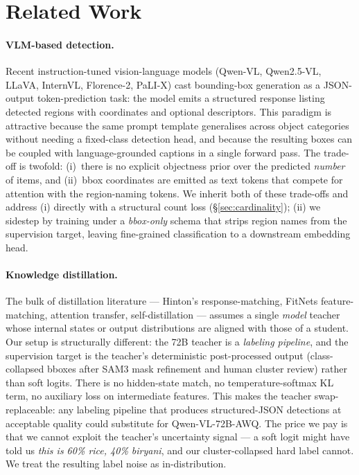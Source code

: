 \documentclass[10pt,twocolumn,letterpaper]{article}
\begin{document}
\section{Related Work}
\label{sec:related}

\paragraph{VLM-based detection.} Recent instruction-tuned vision-language
models (Qwen-VL, Qwen2.5-VL, LLaVA, InternVL, Florence-2, PaLI-X) cast
bounding-box generation as a JSON-output token-prediction task: the model
emits a structured response listing detected regions with coordinates and
optional descriptors. This paradigm is attractive because the same prompt
template generalises across object categories without needing a fixed-class
detection head, and because the resulting boxes can be coupled with
language-grounded captions in a single forward pass. The trade-off is
twofold: (i)~there is no explicit objectness prior over the predicted
\emph{number} of items, and (ii)~bbox coordinates are emitted as text
tokens that compete for attention with the region-naming tokens. We
inherit both of these trade-offs and address (i) directly with a structural
count loss (\S\ref{sec:cardinality}); (ii) we sidestep by training under a
\emph{bbox-only} schema that strips region names from the supervision
target, leaving fine-grained classification to a downstream embedding head.

\paragraph{Knowledge distillation.} The bulk of distillation literature ---
Hinton's response-matching, FitNets feature-matching, attention transfer,
self-distillation --- assumes a single \emph{model} teacher whose internal
states or output distributions are aligned with those of a student. Our
setup is structurally different: the 72B teacher is a \emph{labeling
pipeline}, and the supervision target is the teacher's deterministic
post-processed output (class-collapsed bboxes after SAM3 mask refinement
and human cluster review) rather than soft logits. There is no
hidden-state match, no temperature-softmax KL term, no auxiliary loss
on intermediate features. This makes the teacher swap-replaceable: any
labeling pipeline that produces structured-JSON detections at acceptable
quality could substitute for Qwen-VL-72B-AWQ. The price we pay is that we
cannot exploit the teacher's uncertainty signal --- a soft logit might
have told us \emph{this is 60\% rice, 40\% biryani}, and our cluster-collapsed
hard label cannot. We treat the resulting label noise as in-distribution.
\end{document}
